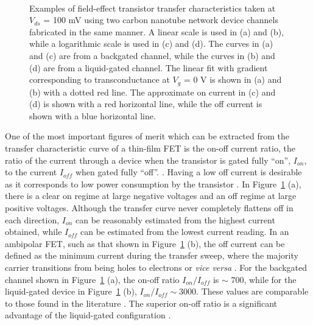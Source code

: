 \documentclass[
  a4paper,
]{scrbook}
\begin{document}
\begin{figure}
\begin{minipage}[t]{0.45\linewidth}
{{}

}

\end{minipage}%
%
\begin{minipage}[t]{0.01\linewidth}

{\centering 

~

}

\end{minipage}%

\caption[Examples of field-effect transistor transfer characteristics
when back-gated and liquid-gated, showing transconductance, on-current
and off-current.]{\label{fig-gating-transfer}Examples of field-effect
transistor transfer characteristics taken at \(V_{ds}\) = 100 mV using
two carbon nanotube network device channels fabricated in the same
manner. A linear scale is used in (a) and (b), while a logarithmic scale
is used in (c) and (d). The curves in (a) and (c) are from a backgated
channel, while the curves in (b) and (d) are from a liquid-gated
channel. The linear fit with gradient corresponding to transconductance
at \(V_g\) = 0 V is shown in (a) and (b) with a dotted red line. The
approximate on current in (c) and (d) is shown with a red horizontal
line, while the off current is shown with a blue horizontal line.}

\end{figure}

One of the most important figures of merit which can be extracted from
the transfer characteristic curve of a thin-film FET is the on-off
current ratio, the ratio of the current through a device when the
transistor is gated fully ``on'', \(I_{on}\), to the current \(I_{off}\)
when gated fully ``off''. \autocite{Kauffman2008,Petti2016,Shkodra2021}.
Having a low off current is desirable as it corresponds to low power
consumption by the transistor \autocite{Rouhi2010}. In
Figure~\ref{fig-gating-transfer} (a), there is a clear on regime at
large negative voltages and an off regime at large positive voltages.
Although the transfer curve never completely flattens off in each
direction, \(I_{on}\) can be reasonably estimated from the highest
current obtained, while \(I_{off}\) can be estimated from the lowest
current reading. In an ambipolar FET, such as that shown in
Figure~\ref{fig-gating-transfer} (b), the off current can be defined as
the minimum current during the transfer sweep, where the majority
carrier transitions from being holes to electrons or \emph{vice versa}
\autocite{Petti2016,Zheng2017}. For the backgated channel shown in
Figure~\ref{fig-gating-transfer} (a), the on-off ratio
\(I_{on}/I_{off}\) is \(\sim\) 700, while for the liquid-gated device in
Figure~\ref{fig-gating-transfer} (b), \(I_{on}/I_{off} \sim 3000\).
These values are comparable to those found in the literature
\autocite{Avouris2007,Kauffman2008,Heller2010}. The superior on-off
ratio is a significant advantage of the liquid-gated configuration
\autocite{Shkodra2021}.
\end{document}
